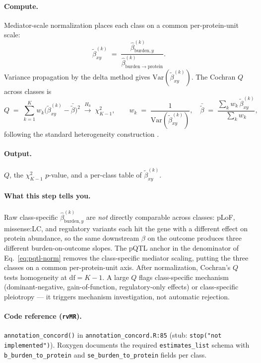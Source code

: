 \documentclass[11pt]{article}
\begin{document}
\paragraph{Compute.} Mediator-scale normalization places each class on a common per-protein-unit scale:
\begin{equation}
\tilde\beta^{(k)}_{xy} \;=\; \frac{\hat\beta^{(k)}_{\mathrm{burden},y}}{\hat\beta^{(k)}_{\mathrm{burden}\to\mathrm{protein}}}.
\label{eq:pqtl-norm}
\end{equation}
Variance propagation by the delta method gives $\mathrm{Var}(\tilde\beta^{(k)}_{xy})$. The Cochran $Q$ across classes is
\begin{equation}
Q \;=\; \sum_{k=1}^{K} w_k\bigl(\tilde\beta^{(k)}_{xy} - \bar{\tilde\beta}\bigr)^2 \;\xrightarrow{H_0}\; \chi^2_{K-1},\qquad w_k \;=\; \frac{1}{\mathrm{Var}(\tilde\beta^{(k)}_{xy})},\quad \bar{\tilde\beta} \;=\; \frac{\sum_k w_k\,\tilde\beta^{(k)}_{xy}}{\sum_k w_k},
\label{eq:cochran-Q}
\end{equation}
following the standard heterogeneity construction \citep{Cochran1954}.

\paragraph{Output.} $Q$, the $\chi^2_{K-1}$ $p$-value, and a per-class table of $\tilde\beta^{(k)}_{xy}$.

\paragraph{What this step tells you.} Raw class-specific $\hat\beta^{(k)}_{\mathrm{burden},y}$ are \emph{not} directly comparable across classes: pLoF, missense:LC, and regulatory variants each hit the gene with a different effect on protein abundance, so the same downstream $\beta$ on the outcome produces three different burden-on-outcome slopes. The pQTL anchor in the denominator of Eq.~\eqref{eq:pqtl-norm} removes the class-specific mediator scaling, putting the three classes on a common per-protein-unit axis. After normalization, Cochran's $Q$ tests homogeneity at $\mathrm{df}=K-1$. A large $Q$ flags class-specific mechanism (dominant-negative, gain-of-function, regulatory-only effects) or class-specific pleiotropy --- it triggers mechanism investigation, not automatic rejection.

\paragraph{Code reference (\texttt{rvMR}).} \verb|annotation_concord()| in \verb|annotation_concord.R:85| (stub: \verb|stop("not implemented")|). Roxygen documents the required \verb|estimates_list| schema with \verb|b_burden_to_protein| and \verb|se_burden_to_protein| fields per class.
\end{document}
